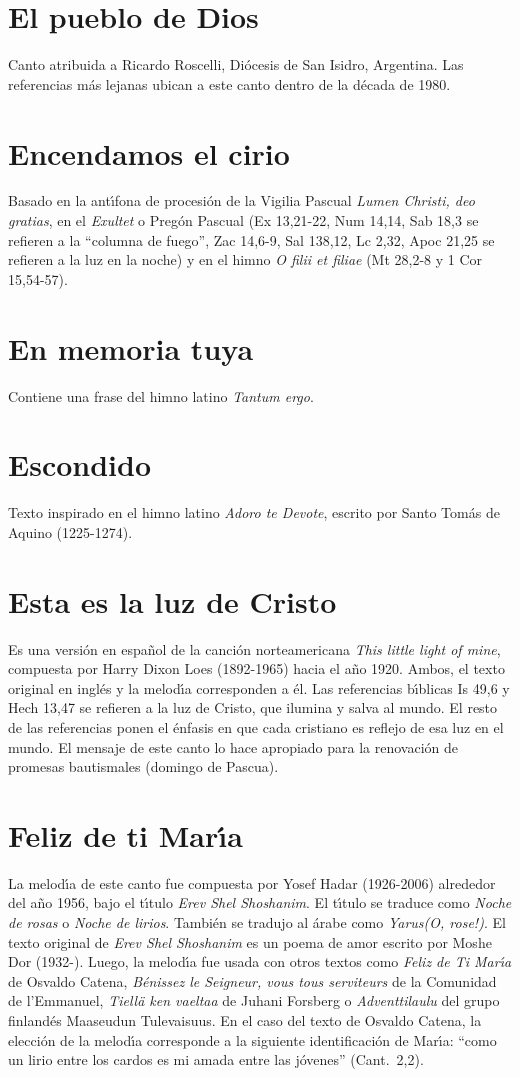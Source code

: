 \documentclass[landscape,12pt]{report}
\begin{document}
\section*{\small El pueblo de Dios} \noindent Canto atribuida a Ricardo Roscelli, Di\'ocesis de San Isidro, Argentina. Las referencias m\'as lejanas ubican a este canto dentro de la d\'ecada de 1980.
\section*{\small Encendamos el cirio} \noindent Basado en la ant\'\i fona de procesi\'on de la Vigilia Pascual \textit{Lumen Christi, deo gratias}, en el \textit{Exultet} o Preg\'on Pascual (Ex 13,21-22, Num 14,14, Sab 18,3 se refieren a la ``columna de fuego'', Zac 14,6-9, Sal 138,12, Lc 2,32, Apoc 21,25 se refieren a la luz en la noche) y en el himno \textit{O filii et filiae} (Mt 28,2-8 y 1 Cor 15,54-57).
\section*{\small En memoria tuya} \noindent Contiene una frase del himno latino \textit{Tantum ergo}.
\section*{\small Escondido} \noindent Texto inspirado en el himno latino \textit{Adoro te Devote}, escrito por Santo Tom\'as de Aquino (1225-1274).  
\section*{\small Esta es la luz de Cristo} \noindent Es una versi\'on en espa\~nol de la canci\'on norteamericana \emph{This little light of mine}, compuesta por Harry Dixon Loes (1892-1965) hacia el a\~no 1920. Ambos, el texto original en ingl\'es y la melod\'\i a corresponden a \'el. Las referencias b\'\i blicas Is 49,6 y Hech 13,47 se refieren a la luz de Cristo, que ilumina y salva al mundo. El resto de las referencias ponen el \'enfasis en que cada cristiano es reflejo de esa luz en el mundo. El mensaje de este canto lo hace apropiado para la renovaci\'on de promesas bautismales (domingo de Pascua).
\section*{\small Feliz de ti Mar\'\i a} La melod\'\i a de este canto fue compuesta por Yosef Hadar (1926-2006) alrededor del a\~no 1956, bajo el t\'\i tulo \emph{Erev Shel Shoshanim}. El t\'\i tulo se traduce como \emph{Noche de rosas} o \emph{Noche de lirios}. Tambi\'en se tradujo al \'arabe como \emph{Yarus(O, rose!)}. El texto original de \emph{Erev Shel Shoshanim} es un poema de amor escrito por Moshe Dor (1932-). Luego, la melod\'\i a fue usada con otros textos como \emph{Feliz de Ti Mar\'\i a} de Osvaldo Catena, \emph{B\'enissez le Seigneur, vous tous serviteurs} de la Comunidad de l'Emmanuel, \emph{Tiell\"a ken vaeltaa} de Juhani Forsberg o \emph{Adventtilaulu} del grupo finland\'es Maaseudun Tulevaisuus. En el caso del texto de Osvaldo Catena, la elecci\'on de la melod\'\i a corresponde a la siguiente identificaci\'on de Mar\'\i a: ``como un lirio entre los cardos es mi amada entre las j\'ovenes'' \mbox{(Cant. 2,2).}
\end{document}
